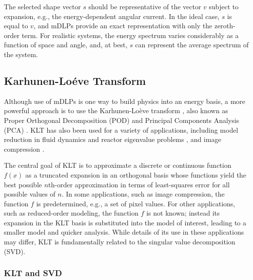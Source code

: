 \documentclass[5p,times,twocolumn,10pt]{elsarticle}
\begin{document}
    The selected shape vector $s$ should be representative of the vector $v$ 
    subject to expansion, e.g., the energy-dependent angular current.  
    In the ideal case, $s$ is equal to $v$, and mDLPs provide an exact 
    representation with only the zeroth-order term.
    For realistic systems, the energy spectrum varies considerably as 
    a function of space and angle, and, at best, $s$ can represent the 
    average spectrum of the system.
    
    \subsection{Karhunen-Lo\'{e}ve Transform}
    
    Although use of mDLPs is one way to build physics into 
    an energy basis, a more powerful approach is to use  
    the Karhunen-Lo\`{e}ve transform \cite{Dony2001}, also  
    known as Proper Orthogonal Decomposition (POD) \cite{Buchan2013} 
    and Principal Components Analysis (PCA) \cite{Dony2001}.  KLT has also been 
    used for a variety of applications, including model reduction in fluid 
    dynamics \cite{Sirovich1987} and reactor eigenvalue problems 
    \cite{Buchan2013}, and image compression \cite{Dony2001}.
    
    The central goal of KLT is to approximate a discrete or continuous function 
    $f(x)$ as a truncated expansion in an orthogonal basis whose functions 
    yield the best possible $n$th-order approximation in terms of least-squares 
    error for all possible values of $n$.  In some applications, such as image 
    compression, the function $f$ is predetermined, e.g., a set of pixel values. 
    For other applications, such as reduced-order modeling, the function $f$ is 
    not known; instead its expansion in the KLT basis is substituted into the 
    model of interest, leading to a smaller model and quicker analysis. While 
    details of its use in these applications may differ, KLT is fundamentally 
    related to the singular value decomposition (SVD).
    
    \subsubsection{KLT and SVD}
    
\end{document}

